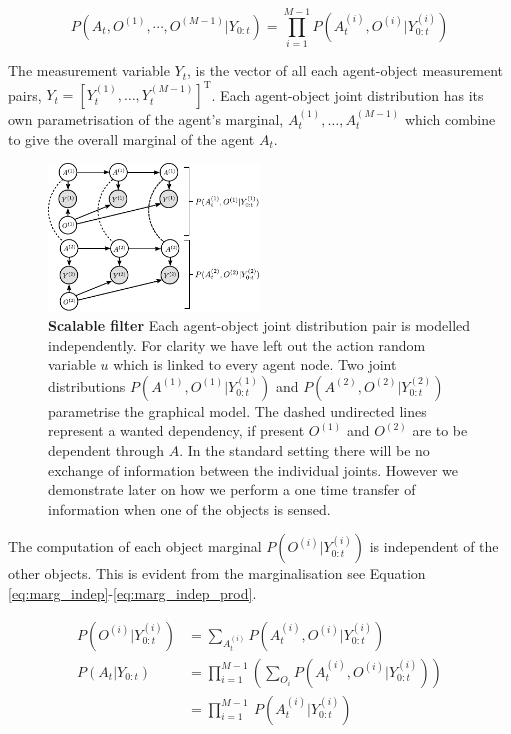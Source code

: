 \begin{equation}\label{eq:pair_wise_joint}
 P(A_t,O^{(1)},\cdots,O^{(M-1)}|Y_{0:t}) = \prod\limits_{i=1}^{M-1} P(A^{(i)}_t,O^{(i)}|Y^{(i)}_{0:t})
\end{equation}

The measurement variable $Y_t$, is the vector of all each agent-object 
measurement pairs, $Y_t = \left[Y^{(1)}_t,\dots,Y^{(M-1)}_t\right]^{\mathrm{T}}$. Each agent-object joint distribution has its own parametrisation of the agent's marginal,
$A^{(1)}_t,\dots,A^{(M-1)}_t$ which combine to give the overall marginal of the agent $A_t$.

\begin{figure}
\centering
  \includegraphics[width=0.5\textwidth]{./ch5-MLMF/Figures/Figure9.pdf}
  \caption{\textbf{Scalable filter} Each agent-object joint distribution pair is modelled independently. For clarity we have left 
  out the action random variable $u$ which is linked to every agent node.
  Two joint distributions $P(A^{(1)},O^{(1)}|Y^{(1)}_{0:t})$   and $P(A^{(2)},O^{(2)}|Y^{(2)}_{0:t})$ parametrise the graphical model. 
  The dashed undirected lines represent a wanted dependency, if present $O^{(1)}$ and $O^{(2)}$ are to be dependent through $A$. In
  the standard setting there will be no exchange of information between the individual joints. However we demonstrate later on how
  we perform a one time transfer of information when one of the objects is sensed.}
  \label{fig:scalable_mlmf_dae}
\end{figure}

The computation of each object marginal $P(O^{(i)}|Y^{(i)}_{0:t})$ is independent of the other objects. This is evident from the marginalisation 
see Equation \ref{eq:marg_indep}-\ref{eq:marg_indep_prod}.

\begin{align}
 P(O^{(i)}|Y^{(i)}_{0:t}) &= \sum\limits_{A^{(i)}_t} P(A^{(i)}_t,O^{(i)}|Y^{(i)}_{0:t}) \label{eq:marg_indep} \\
 P(A_t|Y_{0:t})   &= \prod\limits_{i=1}^{M-1} \left(\sum\limits_{O_i} P(A^{(i)}_t,O^{(i)}|Y^{(i)}_{0:t})\right)  \\
	    &= \prod\limits_{i=1}^{M-1} \ P(A^{(i)}_t|Y^{(i)}_{0:t}) \label{eq:marg_indep_prod}
\end{align}

